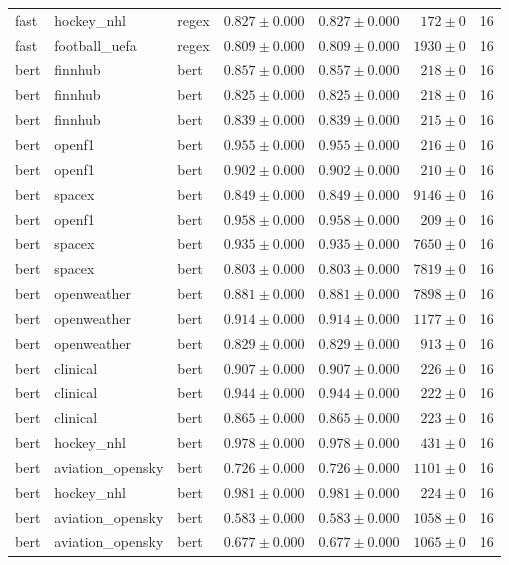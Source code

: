 \begin{table}[htbp]
\begin{tabular}{l l l r r r r}
fast & hockey\_nhl & regex & $0.827\pm0.000$ & $0.827\pm0.000$ & $172\pm0$ & 16 \\
fast & football\_uefa & regex & $0.809\pm0.000$ & $0.809\pm0.000$ & $1930\pm0$ & 16 \\
bert & finnhub & bert & $0.857\pm0.000$ & $0.857\pm0.000$ & $218\pm0$ & 16 \\
bert & finnhub & bert & $0.825\pm0.000$ & $0.825\pm0.000$ & $218\pm0$ & 16 \\
bert & finnhub & bert & $0.839\pm0.000$ & $0.839\pm0.000$ & $215\pm0$ & 16 \\
bert & openf1 & bert & $0.955\pm0.000$ & $0.955\pm0.000$ & $216\pm0$ & 16 \\
bert & openf1 & bert & $0.902\pm0.000$ & $0.902\pm0.000$ & $210\pm0$ & 16 \\
bert & spacex & bert & $0.849\pm0.000$ & $0.849\pm0.000$ & $9146\pm0$ & 16 \\
bert & openf1 & bert & $0.958\pm0.000$ & $0.958\pm0.000$ & $209\pm0$ & 16 \\
bert & spacex & bert & $0.935\pm0.000$ & $0.935\pm0.000$ & $7650\pm0$ & 16 \\
bert & spacex & bert & $0.803\pm0.000$ & $0.803\pm0.000$ & $7819\pm0$ & 16 \\
bert & openweather & bert & $0.881\pm0.000$ & $0.881\pm0.000$ & $7898\pm0$ & 16 \\
bert & openweather & bert & $0.914\pm0.000$ & $0.914\pm0.000$ & $1177\pm0$ & 16 \\
bert & openweather & bert & $0.829\pm0.000$ & $0.829\pm0.000$ & $913\pm0$ & 16 \\
bert & clinical & bert & $0.907\pm0.000$ & $0.907\pm0.000$ & $226\pm0$ & 16 \\
bert & clinical & bert & $0.944\pm0.000$ & $0.944\pm0.000$ & $222\pm0$ & 16 \\
bert & clinical & bert & $0.865\pm0.000$ & $0.865\pm0.000$ & $223\pm0$ & 16 \\
bert & hockey\_nhl & bert & $0.978\pm0.000$ & $0.978\pm0.000$ & $431\pm0$ & 16 \\
bert & aviation\_opensky & bert & $0.726\pm0.000$ & $0.726\pm0.000$ & $1101\pm0$ & 16 \\
bert & hockey\_nhl & bert & $0.981\pm0.000$ & $0.981\pm0.000$ & $224\pm0$ & 16 \\
bert & aviation\_opensky & bert & $0.583\pm0.000$ & $0.583\pm0.000$ & $1058\pm0$ & 16 \\
bert & aviation\_opensky & bert & $0.677\pm0.000$ & $0.677\pm0.000$ & $1065\pm0$ & 16 \\

\end{tabular}
\end{table}
